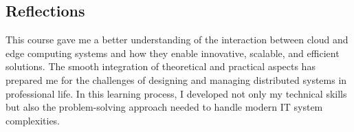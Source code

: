 \subsection{Reflections}
\indent \indent This course gave me a better understanding of the interaction between cloud and edge computing systems and how they enable innovative, scalable, and efficient solutions. The smooth integration of theoretical and practical aspects has prepared me for the challenges of designing and managing distributed systems in professional life. In this learning process, I developed not only my technical skills but also the problem-solving approach needed to handle modern IT system complexities.